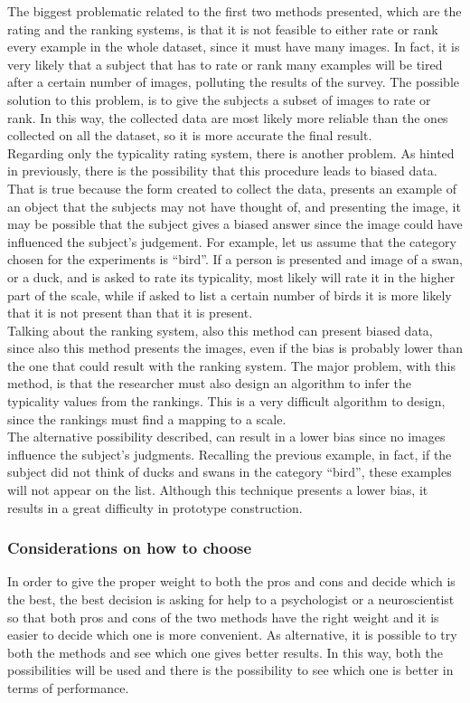 \documentclass[conference]{IEEEtran}
\begin{document}
				The biggest problematic related to the first two methods presented, which are the rating and the ranking systems, is that it is not feasible to either rate or rank every example in the whole 
				dataset, since it must have many images. In fact, it is very likely that a subject that has to rate or rank many examples will be tired after a certain number of images, polluting the results of the survey.
				The possible solution to this problem, is to give the subjects a subset of images to rate or rank. In this way, the collected data are most likely more reliable than the ones collected on all the dataset, 
				so it is more accurate the final result. \\
				Regarding only the typicality rating system, there is another problem. As hinted in previously, there is the possibility that this procedure leads to biased data. That is true because the form 
				created to collect the data, presents an example of an object that the subjects may not have thought of, and presenting the image, it may be possible that the subject gives a biased answer since 
				the image could have influenced the subject's judgement. For example, let us assume that the category chosen for the experiments is ``bird''. If a person is presented and image of a swan, 
				or a duck, and is asked to rate its typicality, most likely will rate it in the higher part of the scale, while if asked to list a certain number of birds it is more likely that it is not 
				present than that it is present.\\
				Talking about the ranking system, also this method can present biased data, since also this method presents the images, even if the bias is probably lower than the one that could result with the ranking system. 
				The major problem, with this method, is that the researcher must also design an algorithm to infer the typicality values from the rankings. This is a very difficult algorithm to design, since the rankings must 
				find a mapping to a scale.\\
				The alternative possibility described, can result in a lower bias since no images influence the subject's judgments. Recalling the previous example, in fact, if the subject did not think of 
				ducks and swans in the category ``bird'', these examples will not appear on the list. Although this technique presents a lower bias, it results in a great difficulty in prototype construction.
			
			\subsubsection{Considerations on how to choose}
				In order to give the proper weight to both the pros and cons and decide which is the best, the best decision is asking for help to a psychologist or a neuroscientist so that both pros and cons of the two 
				methods have the right weight and it is easier to decide which one is more convenient.
				As alternative, it is possible to try both the methods and see which one gives better results. In this way, both the possibilities will be used and there is the possibility to see which one is better in 
				terms of performance. 
			
\end{document}
